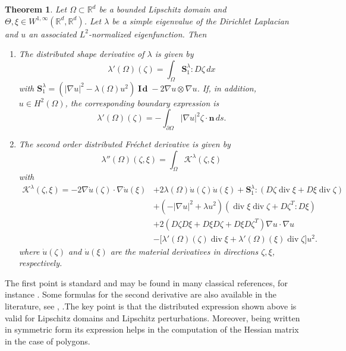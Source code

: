 \documentclass[JEP,XML,SOM,Unicode,ThmDefs,NoFloatCountersInSection,published]{cedram}
\newenvironment{enumeratei}
{\bgroup\def\theenumi{\roman{enumi}}\def\theenumii{\arabic{enumii}}\begin{enumerate}}
{\end{enumerate}\egroup}
\theoremstyle{plain}
\newtheorem{thm}{Theorem}[section]
\theoremstyle{definition}
\newcommand{\di}{\operatorname{div}}
\newcommand{\bo}[1]{{\boldsymbol#1}}
\newcommand{\Id}{\operatorname{{\bo I\!\bo d}}}
\let\Bbb\mathbb
\def\R{\mathbb{R}}
\begin{document}
\begin{thm}\label{thm:sh-deriv-eig}
Let $\Omega\subset \R^d$ be a bounded Lipschitz domain and $\Theta,\xi \!\in\! W^{1,\infty}(\Bbb{R}^d,\Bbb{R}^d)$. Let $\lambda$ be a simple eigenvalue of the Dirichlet Laplacian and $u$ an associated $L^2$\nobreakdash-normalized eigenfunction. Then
\begin{enumeratei}
\item
The distributed shape derivative of $\lambda$ is given by
\[
\lambda'(\Omega)(\zeta) = \int_\Omega \bo S_1^\lambda : D\zeta \, dx
\]
with $\bo S_1^\lambda = (|\nabla u|^2 -\lambda(\Omega) u^2)\Id -2\nabla u \otimes \nabla u$. If, in addition, $u \in H^2(\Omega)$, the corresponding boundary expression is
\[
\lambda'(\Omega)(\zeta) = -\int_{\partial \Omega} |\nabla u|^2\zeta\cdot \bo n\, ds.
\]

\item
The second order distributed Fréchet derivative is given by
\[
\lambda''(\Omega)(\zeta,\xi)= \int_\Omega \mathcal K^\lambda (\zeta,\xi)
\]
with
\begin{align*}
\mathcal K^\lambda(\zeta,\xi)  = -2\nabla \dot u(\zeta)\cdot \nabla \dot u(\xi)&+2\lambda(\Omega)\dot u(\zeta) \dot u(\xi)+ \bo S_1^\lambda: (D\zeta\di \xi+D\xi \di \zeta) \\
& +\left(-|\nabla u|^2+\lambda u^2\right) (\di \xi \di \zeta+D\zeta^T:D\xi)\\
& +2 (D\zeta D\xi+D\xi D\zeta+D\xi D\zeta^T)\nabla u\cdot \nabla u\\
& -\big[\lambda'(\Omega)(\zeta)\di \xi+\lambda'(\Omega)(\xi) \di \zeta \big]u^2 .
\end{align*}
where $\dot u(\zeta)$ and $\dot u(\xi)$ are the material derivatives in directions $\zeta, \xi$, respectively.
\end{enumeratei}
\end{thm}

The first point is standard and may be found in many classical references, for instance \cite{henrot-pierre-english}. Some formulas for the second derivative are also available in the literature, see \cite{henrot-pierre-english}, \cite{HPR04}.The key point is that the distributed expression shown above is valid for Lipschitz domains and Lipschitz perturbations. Moreover, being written in symmetric form its expression helps in the computation of the Hessian matrix in the case of polygons.
\end{document}
